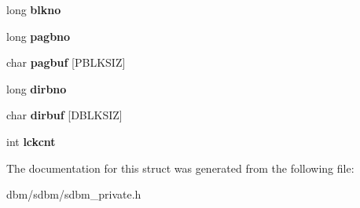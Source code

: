 \begin{DoxyCompactItemize}
\item 
\hypertarget{structapr__sdbm__t_a6d3b10b2622d58de02d9642a09b63359}{long {\bfseries blkno}}\label{structapr__sdbm__t_a6d3b10b2622d58de02d9642a09b63359}

\item 
\hypertarget{structapr__sdbm__t_a45cca39713db088a264b6b2eea518a7f}{long {\bfseries pagbno}}\label{structapr__sdbm__t_a45cca39713db088a264b6b2eea518a7f}

\item 
\hypertarget{structapr__sdbm__t_a026d7cdf20222070455f73415342004f}{char {\bfseries pagbuf} \mbox{[}P\-B\-L\-K\-S\-I\-Z\mbox{]}}\label{structapr__sdbm__t_a026d7cdf20222070455f73415342004f}

\item 
\hypertarget{structapr__sdbm__t_aab0f446ab0183d01e25265b0ca80a4cc}{long {\bfseries dirbno}}\label{structapr__sdbm__t_aab0f446ab0183d01e25265b0ca80a4cc}

\item 
\hypertarget{structapr__sdbm__t_a968812c9b4acfb2438c7b89e9a09c6ca}{char {\bfseries dirbuf} \mbox{[}D\-B\-L\-K\-S\-I\-Z\mbox{]}}\label{structapr__sdbm__t_a968812c9b4acfb2438c7b89e9a09c6ca}

\item 
\hypertarget{structapr__sdbm__t_a6f0fbb76a588b7d8cf798bcecf3df1b8}{int {\bfseries lckcnt}}\label{structapr__sdbm__t_a6f0fbb76a588b7d8cf798bcecf3df1b8}

\end{DoxyCompactItemize}


The documentation for this struct was generated from the following file\-:\begin{DoxyCompactItemize}
\item 
dbm/sdbm/sdbm\-\_\-private.\-h\end{DoxyCompactItemize}
